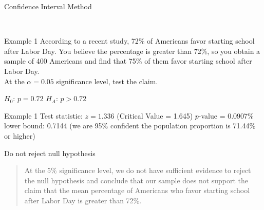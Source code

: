 \documentclass[t]{beamer}
\begin{document}
\begin{frame}{Confidence Interval Method}
\begin{center}
\newline\\
\end{center}
\end{frame}

\begin{frame}{Example 1}
According to a recent study, 72\% of Americans favor starting school after Labor Day. You believe the percentage is greater than 72\%, so you obtain a sample of 400 Americans and find that 75\% of them favor starting school after Labor Day. \newline\\

At the $\alpha = 0.05$ significance level, test the claim.	\newline\\	\pause

$H_0: \, p = 0.72$ \newline
$H_A: \, p > 0.72$
\end{frame}

\begin{frame}{Example 1}
Test statistic: $z = 1.336$ (Critical Value = 1.645) \newline
$p$-value = 0.0907\% lower bound: 0.7144	 \newline
(we are 95\% confident the population proportion is 71.44\% or higher)	\newline\\	\pause

Do not reject null hypothesis	\newline\\	\pause

\begin{quote}
At the 5\% significance level, we do not have sufficient evidence to reject the null hypothesis and conclude that our sample does not support the claim that the mean percentage of Americans who favor starting school after Labor Day is greater than 72\%.
\end{quote}
\end{frame}
\end{document}
